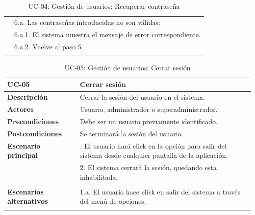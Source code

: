 \begin{table}[H]
\begin{center}
\begin{tabularx}{16.4cm}{|l|X|}
      & 6.a. Las contraseñas introducidas no son válidas:\\
      & \hspace{0.3cm} 6.a.1. El sistema muestra el mensaje de error correspondiente.\\
      & \hspace{0.3cm} 6.a.2. Vuelve al paso 5.\\
      & \\
      \hline
    \end{tabularx}
    \caption{UC-04: Gestión de usuarios: Recuperar contraseña}
    \label{tab:CU-restablecer-contrasena}
  \end{center}
\end{table}


\begin{table}[H]
  \begin{center}
    \begin{tabularx}{16.4cm}{|l|X|}
      \hline
      \textbf{UC-05} & \textbf{Cerrar sesión}\\
      \hline
      \textbf{Descripción} & Cerrar la sesión del usuario en el sistema.\\
      \hline
      \textbf{Actores} & Usuario, administrador o superadministrador.\\
      \hline
      \textbf{Precondiciones} & Debe ser un usuario previamente identificado.\\
      \hline
      \textbf{Postcondiciones} & Se terminará la sesión del usuario.\\
      \hline
      \textbf{Escenario principal} & \smallskip 1. El usuario hará click en la opción para salir del sistema desde cualquier pantalla de la aplicación.\\
      & 2. El sistema cerrará la sesión, quedando esta inhabilitada.\\
      & \\
      \hline
      \textbf{Escenarios alternativos} & \smallskip 1.a. El usuario hace click en salir del sistema a través del menú de opciones.\\
      & \\
      \hline
    \end{tabularx}
    \caption{UC-05: Gestión de usuarios: Cerrar sesión}
    \label{tab:CU-cerrar-sesion}
  \end{center}
\end{table}


